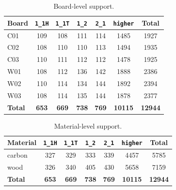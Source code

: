 \documentclass[review,3p,times]{elsarticle}
\begin{document}
\begin{table}[htbp]
\centering
\caption{Board-level support.}
\label{tab:s1}
\begin{tabular}{lcccccc}
\toprule
\textbf{Board} & \texttt{1\_1H} & \texttt{1\_1T} & \texttt{1\_2} & \texttt{2\_1} & \texttt{higher} & \textbf{Total} \\
\midrule
C01 & 109 & 108 & 111 & 114 & 1485 & 1927 \\
C02 & 108 & 110 & 110 & 113 & 1494 & 1935 \\
C03 & 110 & 111 & 112 & 112 & 1478 & 1925 \\
W01 & 108 & 112 & 136 & 142 & 1888 & 2386 \\
W02 & 110 & 114 & 134 & 144 & 1892 & 2394 \\
W03 & 108 & 114 & 135 & 144 & 1878 & 2377 \\
\textbf{Total} & \textbf{653} & \textbf{669} & \textbf{738} & \textbf{769} & \textbf{10115} & \textbf{12944} \\
\bottomrule
\end{tabular}
\end{table}

\begin{table}[htbp]
\centering
\caption{Material-level support.}
\label{tab:s2}
\begin{tabular}{lcccccc}
\toprule
\textbf{Material} & \texttt{1\_1H} & \texttt{1\_1T} & \texttt{1\_2} & \texttt{2\_1} & \texttt{higher} & \textbf{Total} \\
\midrule
carbon & 327 & 329 & 333 & 339 & 4457 & 5785 \\
wood & 326 & 340 & 405 & 430 & 5658 & 7159 \\
\textbf{Total} & \textbf{653} & \textbf{669} & \textbf{738} & \textbf{769} & \textbf{10115} & \textbf{12944} \\
\bottomrule
\end{tabular}
\end{table}
\end{document}
